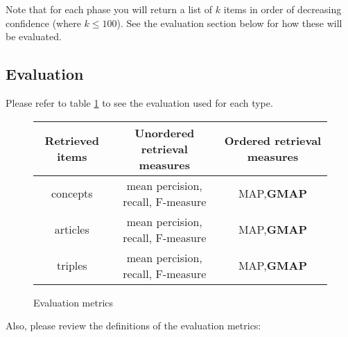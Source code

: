 Note that for each phase you will return a list of $k$ items in order of decreasing confidence (where $k \leq 100$). See the evaluation section below for how these will be evaluated. 
  
\subsection{Evaluation}
Please refer to table \ref{fig:eval} to see the evaluation used for each type.
\begin{figure}[h!]
\begin{tabular}{|c|c|c|}
\hline
	\textbf{Retrieved items} & \textbf{Unordered retrieval measures} & \textbf{Ordered retrieval measures}\\ \hline
	concepts & mean percision, recall, F-measure & MAP,\textbf{GMAP}\\ \hline
	articles & mean percision, recall, F-measure & MAP,\textbf{GMAP}\\ \hline 
	triples & mean percision, recall, F-measure & MAP,\textbf{GMAP}\\\hline
\end{tabular}
\label{fig:eval}
\caption{Evaluation metrics}
\end{figure}

Also, please review the definitions of the evaluation metrics:

